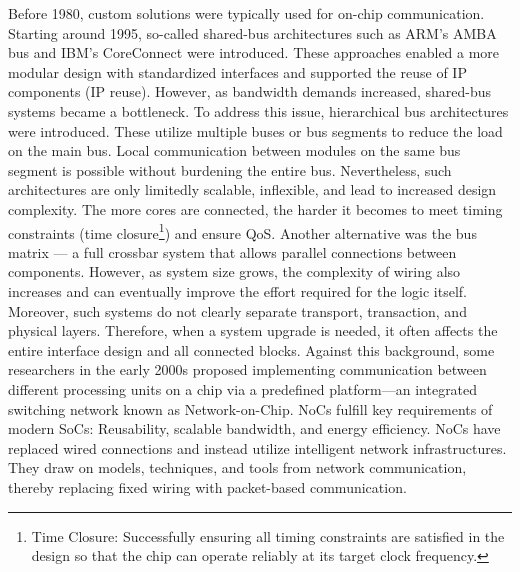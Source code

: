 Before 1980, custom solutions were typically used for on-chip communication. Starting around 1995, so-called shared-bus architectures such as ARM’s AMBA bus \cite{arm_amba_nodate} and IBM’s CoreConnect\cite{international_business_machines_corporation_coreconnect_1999} were introduced. These approaches enabled a more modular design with standardized interfaces and supported the reuse of IP components (IP reuse).
However, as bandwidth demands increased, shared-bus systems became a bottleneck. To address this issue, hierarchical bus architectures were introduced. These utilize multiple buses or bus segments to reduce the load on the main bus. Local communication between modules on the same bus segment is possible without burdening the entire bus. Nevertheless, such architectures are only limitedly scalable, inflexible, and lead to increased design complexity. The more cores are connected, the harder it becomes to meet timing constraints (time closure\footnote{Time Closure: Successfully ensuring all timing constraints are satisfied in the design so that the chip can operate reliably at its target clock frequency.}) and ensure \ac{QoS}.
Another alternative was the bus matrix — a full crossbar system that allows parallel connections between components. However, as system size grows, the complexity of wiring also increases and can eventually improve the effort required for the logic itself. Moreover, such systems do not clearly separate transport, transaction, and physical layers. Therefore, when a system upgrade is needed, it often affects the entire interface design and all connected blocks.
Against this background, some researchers in the early 2000s proposed implementing communication between different processing units on a chip via a predefined platform—an integrated switching network known as Network-on-Chip. NoCs fulfill key requirements of modern \ac{SoC}s: Reusability, scalable bandwidth, and energy efficiency. NoCs have replaced wired connections and instead utilize intelligent network infrastructures. They draw on models, techniques, and tools from network communication, thereby replacing fixed wiring with packet-based communication.\cite{unnikrishnan_network_2021}


